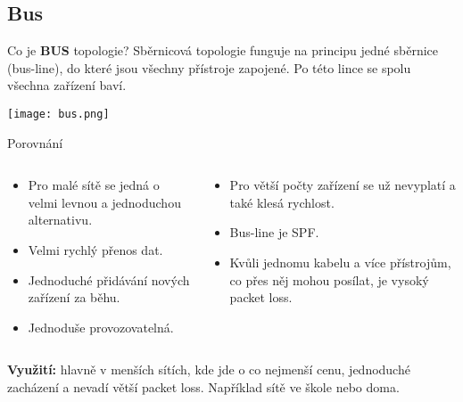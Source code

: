 \documentclass{beamer}
\begin{document}
\subsection{Bus}
\label{sec:bus}
\begin{frame}{Co je \textbf{BUS} topologie?}
 Sběrnicová topologie funguje na principu jedné sběrnice (bus-line), do které
 jsou všechny přístroje zapojené. Po této lince se spolu všechna zařízení baví.

 \texttt{[image: bus.png]}
\end{frame}

\begin{frame}{Porovnání}

\begin{columns}
    \begin{column}{0.45\textwidth}
        \begin{itemize}
            \item Pro malé sítě se jedná o velmi levnou a jednoduchou
             alternativu.
            \item Velmi rychlý přenos dat.
            \item Jednoduché přidávání nových zařízení za běhu.
            \item Jednoduše provozovatelná.
        \end{itemize}
    \end{column}
    \begin{column}{0.45\textwidth}  %
        \begin{itemize}
            \item Pro větší počty zařízení se už nevyplatí a také klesá
             rychlost.
            \item Bus-line je SPF.
            \item Kvůli jednomu kabelu a více přístrojům, co přes něj mohou
             posílat, je vysoký packet loss.
        \end{itemize}
    \end{column}
    \end{columns}
    \vspace{10pt}

\textbf{Využití:} hlavně v menších sítích, kde jde o co nejmenší cenu,
jednoduché zacházení a nevadí větší packet loss. Například sítě ve škole nebo
doma.

\end{frame}
\end{document}

